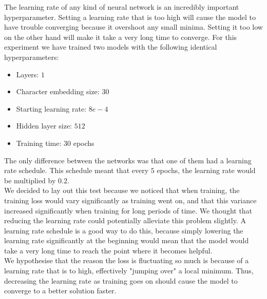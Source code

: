 The learning rate of any kind of neural network is an incredibly important hyperparameter. Setting a learning rate that is too high will cause the model to have trouble converging because it overshoot any small minima. Setting it too low on the other hand will make it take a very long time to converge. For this experiment we have trained two models with the following identical hyperparameters:
\begin{itemize}
	\item Layers: $1$
	\item Character embedding size: 30
	\item Starting learning rate: $8e-4$
	\item Hidden layer size: $512$
	\item Training time: 30 epochs
\end{itemize}
The only difference between the networks was that one of them had a learning rate schedule. This schedule meant that every $5$ epochs, the learning rate would be multiplied by $0.2$. \\

\noindent
We decided to lay out this test because we noticed that when training, the training loss would vary significantly as training went on, and that this variance increased significantly when training for long periods of time. We thought that reducing the learning rate could potentially alleviate this problem slightly. A learning rate schedule is a good way to do this, because simply lowering the learning rate significantly at the beginning would mean that the model would take a very long time to reach the point where it becomes helpful.\\

\noindent
We hypothesise that the reason the loss is fluctuating so much is because of a learning rate that is to high, effectively "jumping over" a local minimum. Thus, decreasing the learning rate as training goes on should cause the model to converge to a better solution faster.